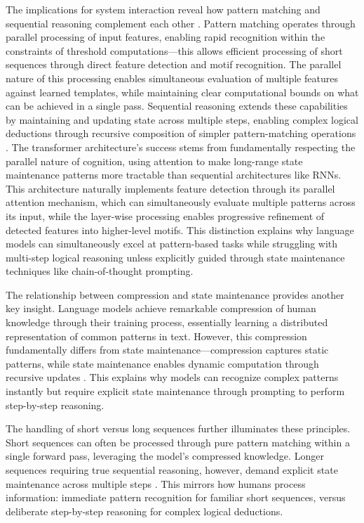 \documentclass[12pt]{article}
\begin{document}
The implications for system interaction reveal how pattern matching and sequential reasoning complement each other \cite{wei2022chain}.
Pattern matching operates through parallel processing of input features, enabling rapid recognition within the constraints of threshold computations---this allows efficient processing of short sequences through direct feature detection and motif recognition.
The parallel nature of this processing enables simultaneous evaluation of multiple features against learned templates, while maintaining clear computational bounds on what can be achieved in a single pass.
Sequential reasoning extends these capabilities by maintaining and updating state across multiple steps, enabling complex logical deductions through recursive composition of simpler pattern-matching operations \cite{dickson2024trust}.
The transformer architecture's success stems from fundamentally respecting the parallel nature of cognition, using attention to make long-range state maintenance patterns more tractable than sequential architectures like RNNs.
This architecture naturally implements feature detection through its parallel attention mechanism, which can simultaneously evaluate multiple patterns across its input, while the layer-wise processing enables progressive refinement of detected features into higher-level motifs.
This distinction explains why language models can simultaneously excel at pattern-based tasks while struggling with multi-step logical reasoning unless explicitly guided through state maintenance techniques like chain-of-thought prompting.

The relationship between compression and state maintenance provides another key insight.
Language models achieve remarkable compression of human knowledge through their training process, essentially learning a distributed representation of common patterns in text.
However, this compression fundamentally differs from state maintenance---compression captures static patterns, while state maintenance enables dynamic computation through recursive updates \cite{dickson2024trust}.
This explains why models can recognize complex patterns instantly but require explicit state maintenance through prompting to perform step-by-step reasoning.

The handling of short versus long sequences further illuminates these principles.
Short sequences can often be processed through pure pattern matching within a single forward pass, leveraging the model's compressed knowledge.
Longer sequences requiring true sequential reasoning, however, demand explicit state maintenance across multiple steps \cite{wei2022chain}.
This mirrors how humans process information: immediate pattern recognition for familiar short sequences, versus deliberate step-by-step reasoning for complex logical deductions.
\end{document}
